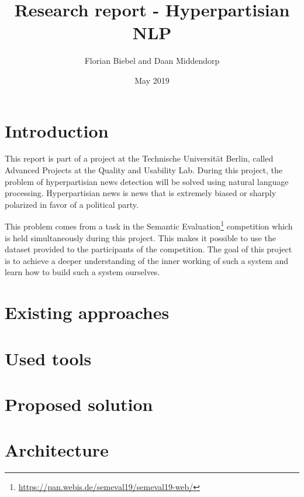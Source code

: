 \documentclass{article}
\title{Research report - Hyperpartisian NLP}
\author{Florian Biebel and Daan Middendorp}
\date{May 2019}
\begin{document}
\maketitle

\section{Introduction}
This report is part of a project at the Technische Universität Berlin, called Advanced Projects at the Quality and Usability Lab. During this project, the problem of hyperpartisian news detection will be solved using natural language processing. Hyperpartisian news is news that is extremely biased or sharply polarized in favor of a political party. 

This problem comes from a task in the Semantic Evaluation\footnote{\url{https://pan.webis.de/semeval19/semeval19-web/}} competition which is held simultaneously during this project. This makes it possible to use the dataset provided to the participants of the competition. The goal of this project is to achieve a deeper understanding of the inner working of such a system and learn how to build such a system ourselves.
\section{Existing approaches}
\section{Used tools}
\section{Proposed solution}
\section{Architecture}
\end{document}
